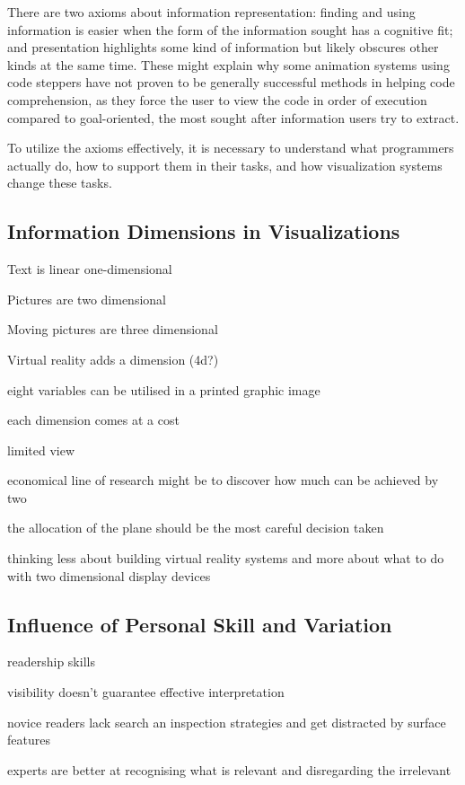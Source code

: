 \documentclass[11pt, a4paper, ngerman, twoside]{article}
\theoremstyle{plain}\newtheorem{Lemma}{Lemma}
\theoremstyle{plain}\newtheorem{Satz}[Lemma]{Satz}
\theoremstyle{definition}\newtheorem{Definition}[Lemma]{Definition}
\theoremstyle{definition}\newtheorem*{Beispiel}{Beispiel}
\theoremstyle{remark}\newtheorem*{Bemerkung}{Bemerkung}
\begin{document}
There are two axioms about information representation: finding and using information is easier when the form of the information sought has a cognitive fit; and presentation highlights some kind of information but likely obscures other kinds at the same time. These might explain why some animation systems using code steppers have not proven to be generally successful methods in helping code comprehension, as they force the user to view the code in order of execution compared to goal-oriented, the most sought after information users try to extract.

To utilize the axioms effectively, it is necessary to understand what programmers actually do, how to support them in their tasks, and how visualization systems change these tasks.

\subsection{Information Dimensions in Visualizations}

Text is linear one-dimensional

Pictures are two dimensional

Moving pictures are three dimensional

Virtual reality adds a dimension (4d?)

eight variables can be utilised in a printed graphic image

each dimension comes at a cost

limited view 

economical line of research might be to discover how much can be achieved by two

the allocation of the plane should be the most careful decision taken

thinking less about building virtual reality systems and more about what to do with two dimensional display devices

\subsection{Influence of Personal Skill and Variation}

readership skills

visibility doesn’t guarantee effective interpretation

novice readers lack search an inspection strategies and get distracted by surface features

experts are better at recognising what is relevant and disregarding the irrelevant
\end{document}
